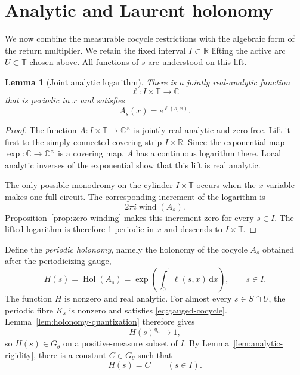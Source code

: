 \documentclass[reqno]{amsart}
\newtheorem{lemma}[theorem]{Lemma}
\theoremstyle{remark}
\numberwithin{equation}{section}
\newcommand{\R}{\mathbb{R}}
\newcommand{\T}{\mathbb{T}}
\newcommand{\C}{\mathbb{C}}
\newcommand{\wind}{\operatorname{wind}}
\newcommand{\Hol}{\operatorname{Hol}}
\newcommand{\dd}{\,\mathrm{d}}
\begin{document}
\section{Analytic and Laurent holonomy}
\label{sec:laurent}

We now combine the measurable cocycle restrictions with the algebraic form of
the return multiplier. We retain the fixed interval
\(I\subset\R\) lifting the active arc \(U\subset\T\) chosen above. All
functions of \(s\) are understood on this lift.

\begin{lemma}[Joint analytic logarithm]
\label{lem:joint-log}
There is a jointly real-analytic function
\[
  \ell:I\times\T\longrightarrow\C
\]
that is periodic in \(x\) and satisfies
\begin{equation}
  A_s(x)=e^{\ell(s,x)}.
  \label{eq:joint-log}
\end{equation}
\end{lemma}

\begin{proof}
The function \(A:I\times\T\to\C^\times\) is jointly real analytic and
zero-free. Lift it first to the simply connected covering strip
\(I\times\R\). Since the exponential map
\(\exp:\C\to\C^\times\) is a covering map, \(A\) has a continuous logarithm
there. Local analytic inverses of the exponential show that this lift is real
analytic.

The only possible monodromy on the cylinder \(I\times\T\) occurs when the
\(x\)-variable makes one full circuit. The corresponding increment of the
logarithm is
\[
  2\pi i\wind(A_s).
\]
Proposition~\ref{prop:zero-winding} makes this increment zero for every
\(s\in I\). The lifted logarithm is therefore 1-periodic in \(x\) and descends
to \(I\times\T\).
\end{proof}

Define the \emph{periodic holonomy}, namely the holonomy of the cocycle
\(A_s\) obtained after the periodicizing gauge,
\begin{equation}
  H(s)
  =\Hol(A_s)
  =\exp\left(\int_0^1\ell(s,x)\dd x\right),
  \qquad s\in I.
  \label{eq:H-def}
\end{equation}
The function \(H\) is nonzero and real analytic. For almost every
\(s\in S\cap U\), the periodic fibre \(K_s\) is nonzero and satisfies
\eqref{eq:gauged-cocycle}. Lemma~\ref{lem:holonomy-quantization} therefore
gives
\[
  H(s)^{q_n}\longrightarrow1,
\]
so \(H(s)\in G_\theta\) on a positive-measure subset of \(I\). By
Lemma~\ref{lem:analytic-rigidity}, there is a constant \(C\in G_\theta\) such
that
\begin{equation}
  H(s)=C
  \qquad (s\in I).
  \label{eq:H-constant}
\end{equation}
\end{document}
